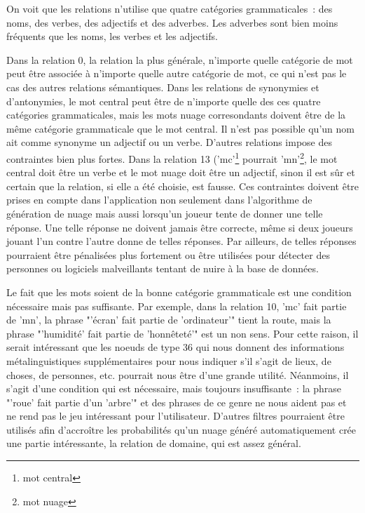 \documentclass[a4paper,11pt,french]{article}
\begin{document}
On voit que les relations n'utilise que quatre catégories grammaticales~: des noms, des verbes, des adjectifs et des adverbes. Les adverbes sont bien moins fréquents que les noms, les verbes et les adjectifs.

Dans la relation 0, la relation la plus générale, n'importe quelle catégorie de mot peut être associée à n'importe quelle autre catégorie de mot, ce qui n'est pas le cas des autres relations sémantiques. Dans les relations de synonymies et d'antonymies, le mot central peut être de n'importe quelle des ces quatre catégories grammaticales, mais les mots nuage corresondants doivent être de la même catégorie grammaticale que le mot central. Il n'est pas possible qu'un nom ait comme synonyme un adjectif ou un verbe. D'autres relations impose des contraintes bien plus fortes. Dans la relation 13 ('mc'\footnote{mot central} pourrait 'mn'\footnote{mot nuage}, le mot central doit être un verbe et le mot nuage doit être un adjectif, sinon il est sûr et certain que la relation, si elle a été choisie, est fausse. Ces contraintes doivent être prises en compte dans l'application non seulement dans l'algorithme de génération de nuage mais aussi lorsqu'un joueur tente de donner une telle réponse. Une telle réponse ne doivent jamais être correcte, même si deux joueurs jouant l'un contre l'autre donne de telles réponses. Par ailleurs, de telles réponses pourraient être pénalisées plus fortement ou être utilisées pour détecter des personnes ou logiciels malveillants tentant de nuire à la base de données.   

Le fait que les mots soient de la bonne catégorie grammaticale est une condition nécessaire mais pas suffisante. Par exemple, dans la relation 10, 'mc' fait partie de 'mn', la phrase "'écran' fait partie de 'ordinateur'" tient la route, mais la phrase "'humidité' fait partie de 'honnêteté'" est un non sens. Pour cette raison, il serait intéressant que les noeuds de type 36 qui nous donnent des informations métalinguistiques supplémentaires pour nous indiquer s'il s'agit de lieux, de choses, de personnes, etc. pourrait nous être d'une grande utilité. Néanmoins, il s'agit d'une condition qui est nécessaire, mais toujours insuffisante~: la phrase "'roue' fait partie d'un 'arbre'" et des phrases de ce genre ne nous aident pas et ne rend pas le jeu intéressant pour l'utilisateur. D'autres filtres pourraient être utilisés afin d'accroître les probabilités qu'un nuage généré automatiquement crée une partie intéressante, la relation de domaine, qui est assez général.     
\end{document}
